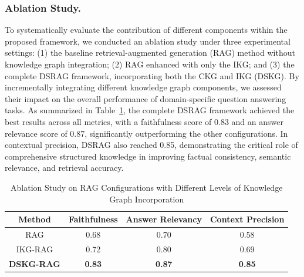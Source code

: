 \documentclass[runningheads]{llncs}
\begin{document}
    \subsubsection{Ablation Study.} To systematically evaluate the contribution of different components within the proposed framework, we conducted an ablation study under three experimental settings: (1) the baseline retrieval-augmented generation (RAG) method without knowledge graph integration; (2) RAG enhanced with only the IKG; and (3) the complete DSRAG framework, incorporating both the CKG and IKG (DSKG). By incrementally integrating different knowledge graph components, we assessed their impact on the overall performance of domain-specific question answering tasks. As summarized in Table~\ref{tab:ablation_study},  the complete DSRAG framework achieved the best results across all metrics, with a faithfulness score of 0.83 and an answer relevance score of 0.87, significantly outperforming the other configurations. In contextual precision, DSRAG also reached 0.85, demonstrating the critical role of comprehensive structured knowledge in improving factual consistency, semantic relevance, and retrieval accuracy.
\begin{table}[H]
    \centering
    
    \caption{Ablation Study on RAG Configurations with Different Levels of Knowledge Graph Incorporation}
    \label{tab:ablation_study}
    \setlength{\tabcolsep}{5pt}
    \renewcommand{\arraystretch}{1.2}
    \begin{tabular}{|c|c|c|c|}
        \hline
        Method  %
        & Faithfulness  %
        & Answer Relevancy  %
        & Context Precision \\
        \hline
        RAG             & 0.68 & 0.70 & 0.58 \\
        \hline
        IKG-RAG & 0.72 & 0.80 & 0.69 \\
        \hline
        \textbf{DSKG-RAG} & \textbf{0.83} & \textbf{0.87} & \textbf{0.85} \\
        \hline
    \end{tabular}
\end{table}
\end{document}
